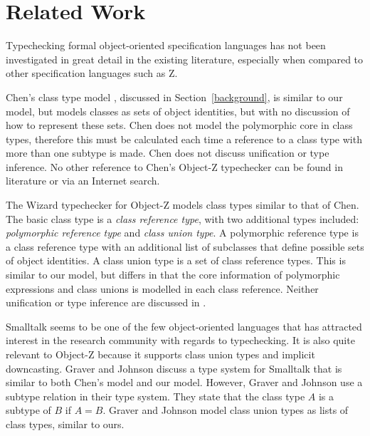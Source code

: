 \section{Related Work}

Typechecking formal object-oriented specification languages has not
been investigated in great detail in the existing literature,
especially when compared to other specification languages such as Z.

Chen's class type model \cite{chen94}, discussed in
Section~\ref{background}, is similar to our model, but models classes
as sets of object identities, but with no discussion of how to
represent these sets. Chen does not model the polymorphic core in
class types, therefore this must be calculated each time a reference
to a class type with more than one subtype is made. Chen does not
discuss unification or type inference. No other reference to Chen's
Object-Z typechecker can be found in literature or via an Internet
search.

The Wizard typechecker for Object-Z \cite{johnston96} models class
types similar to that of Chen. The basic class type is a {\em class
reference type}, with two additional types included: {\em
polymorphic reference type} and {\em class union type}. A polymorphic
reference type is a class reference type with an additional list of
subclasses that define possible sets of object identities. A class
union type is a set of class reference types. This is similar to
our model, but differs in that the core information of polymorphic
expressions and class unions is modelled in each class
reference. Neither unification or type inference are discussed in
\cite{johnston96}.

Smalltalk \cite{goldberg83} seems to be one of the few object-oriented
languages that has attracted interest in the research community with
regards to typechecking. It is also quite relevant to Object-Z because
it supports class union types and implicit downcasting. Graver and
Johnson \cite{graver90} discuss a type system for Smalltalk that is
similar to both Chen's model and our model. However, Graver and
Johnson use a subtype relation in their type system.  They state that
the class type $A$ is a subtype of $B$ if $A = B$. Graver and Johnson
model class union types as lists of class types, similar to ours.


